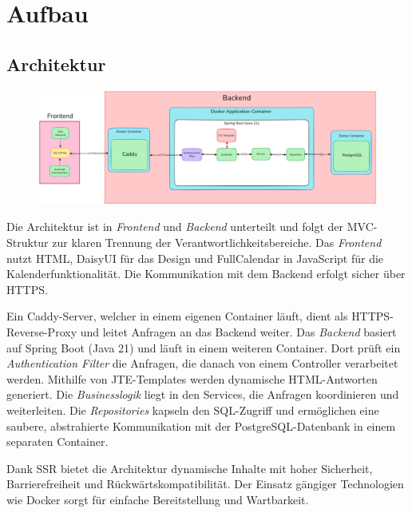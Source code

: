 
\chapter{Aufbau}
\label{ch:aufbau}

\section{Architektur}
\begin{figure}[ht]
    \centering
    \includegraphics[width=\textwidth]{figures/architecture}
    \label{fig:architekturmodell}
\end{figure}
Die Architektur ist in \textit{Frontend} und \textit{Backend} unterteilt und folgt der \gls{MVC-Struktur} zur klaren Trennung der Verantwortlichkeitsbereiche.
Das \textit{Frontend} nutzt \gls{HTML}, \gls{DaisyUI} für das Design und \gls{FullCalendar} in \gls{JavaScript} für die Kalenderfunktionalität.
Die Kommunikation mit dem Backend erfolgt sicher über \gls{HTTPS}.

Ein \gls{Caddy}-Server, welcher in einem eigenen \gls{Container} läuft, dient als \gls{HTTPS-Reverse-Proxy} und leitet Anfragen an das Backend weiter.
Das \textit{Backend} basiert auf \gls{Spring Boot} (Java 21) und läuft in einem weiteren \gls{Container}.
Dort prüft ein \textit{Authentication Filter} die Anfragen, die danach von einem \gls{Controller} verarbeitet werden.
Mithilfe von \gls{JTE}-Templates werden dynamische HTML-Antworten generiert.
Die \textit{Businesslogik} liegt in den \gls{Services}, die Anfragen koordinieren und weiterleiten.
Die \textit{Repositories} kapseln den SQL-Zugriff und ermöglichen eine saubere, abstrahierte Kommunikation
mit der \gls{PostgreSQL}-Datenbank in einem separaten \gls{Container}.

Dank \gls{SSR} bietet die Architektur dynamische Inhalte mit hoher Sicherheit, Barrierefreiheit und Rückwärtskompatibilität.
Der Einsatz gängiger Technologien wie \gls{Docker} sorgt für einfache Bereitstellung und Wartbarkeit.
\clearpage

